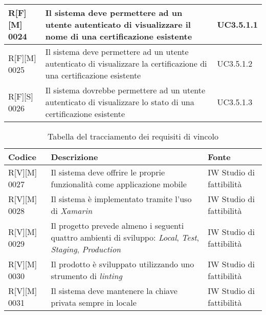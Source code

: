 \begin{center}
\begin{longtable}{|p{2cm}|p{9cm}|p{2cm}|}
\hline
R[F][M] 0024     & Il sistema deve permettere ad un utente autenticato di visualizzare il nome di una certificazione esistente & UC3.5.1.1 \\
\hline
R[F][M] 0025     & Il sistema deve permettere ad un utente autenticato di visualizzare la certificazione di una certificazione esistente & UC3.5.1.2 \\
\hline
R[F][S] 0026     & Il sistema dovrebbe permettere ad un utente autenticato di visualizzare lo stato di una certificazione esistente & UC3.5.1.3 \\
\hline
\end{longtable}%
\end{center}


\begin{center}
\begin{longtable}{|p{2cm}|p{9cm}|p{2cm}|}%
\caption{Tabella del tracciamento dei requisiti di vincolo}
\label{tab:requisiti-vincolo}
\endfirsthead
\endhead
\hline
\textbf{Codice} & \textbf{Descrizione} & \textbf{Fonte}\\
\hline
R[V][M] 0027    & Il sistema deve offrire le proprie funzionalità come applicazione mobile &  IW Studio di fattibilità \\
\hline
R[V][M] 0028    & Il sistema è implementato tramite l’uso di \textit{Xamarin} & IW Studio di fattibilità \\
\hline
R[V][M] 0029    & Il progetto prevede almeno i seguenti quattro ambienti di sviluppo: \textit{Local}, \textit{Test}, \textit{Staging}, \textit{Production} & IW Studio di fattibilità \\
\hline
R[V][M] 0030    & Il prodotto è sviluppato utilizzando uno strumento di \textit{linting} & IW Studio di fattibilità \\
\hline
R[V][M] 0031    & Il sistema deve mantenere la chiave privata sempre in locale & IW Studio di fattibilità \\
\hline
\end{longtable}
\end{center}%



